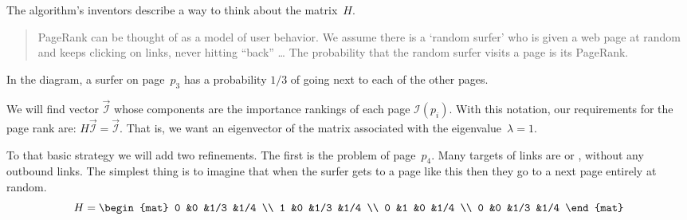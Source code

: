 The algorithm's inventors describe a way to think about the matrix~$H$. 
\begin{quotation}
PageRank can be thought of as a model of user behavior. 
We assume there is a `random surfer' who is
given a web page at random and keeps clicking on links, 
never hitting ``back'' \ldots 
The probability that the random surfer visits a page is its PageRank.
\cite{BrinPage}
\end{quotation}
In the diagram, a surfer on page~$p_3$ has a probability $1/3$ of going 
next to each of the other pages. 

We will find vector $\vec{\mathcal{I}}$ whose components are the
importance rankings of each page $\mathcal{I}(p_i)$.
With this notation, 
our requirements for the page rank are: $H\vec{\mathcal{I}}=\vec{\mathcal{I}}$.
That is, we want an eigenvector of the matrix associated with the
eigenvalue~$\lambda=1$.

To that basic strategy we will add two refinements.
The first is the problem of page~$p_4$.
Many targets of links are 
 or ,
without any outbound links.
The simplest thing is to imagine that when the surfer gets to a page like this
then they go to a next page entirely at random.
\begin{equation*}
  H=\begin{mat}
    0   &0  &1/3  &1/4   \\
    1   &0  &1/3  &1/4   \\
    0   &1  &0    &1/4 \\
    0   &0  &1/3  &1/4
  \end{mat}
\end{equation*}

